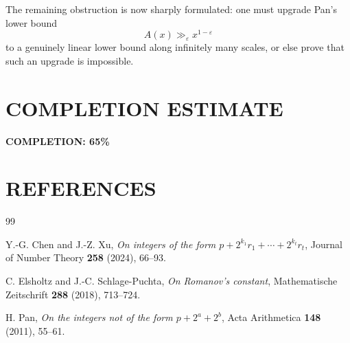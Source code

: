 The remaining obstruction is now sharply formulated: one must upgrade Pan's lower bound
\[
A(x)\gg_{\varepsilon} x^{1-\varepsilon}
\]
to a genuinely linear lower bound along infinitely many scales, or else prove that such an upgrade is impossible.

\section{COMPLETION ESTIMATE}

\textbf{COMPLETION: 65\%}

\section{REFERENCES}

\begin{thebibliography}{99}

Y.-G. Chen and J.-Z. Xu,
\emph{On integers of the form $p+2^{k_1}r_1+\cdots+2^{k_t}r_t$},
Journal of Number Theory \textbf{258} (2024), 66--93.

C. Elsholtz and J.-C. Schlage-Puchta,
\emph{On Romanov's constant},
Mathematische Zeitschrift \textbf{288} (2018), 713--724.

H. Pan,
\emph{On the integers not of the form $p+2^a+2^b$},
Acta Arithmetica \textbf{148} (2011), 55--61.

\end{thebibliography}
